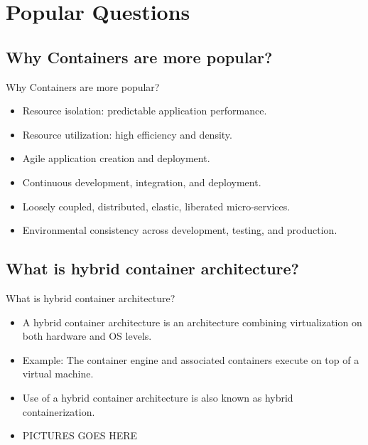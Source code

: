 

\section{Popular Questions}\label{sec:popular-questions}

\subsection{Why Containers are more popular?}\label{subsec:containers-are-more-popular}
\begin{frame}{Why Containers are more popular?}
    \begin{itemize}[<+- | alert@+>]
        \item Resource isolation: predictable application performance.
        \item Resource utilization: high efficiency and density.
        \item Agile application creation and deployment.
        \item Continuous development, integration, and deployment.
        \item Loosely coupled, distributed, elastic, liberated micro-services.
        \item Environmental consistency across development, testing, and production.
    \end{itemize}
\end{frame}

\subsection{What is hybrid container architecture?}\label{subsec:hybrid-container-architecture?}
\begin{frame}{What is hybrid container architecture?}
    \begin{itemize}[<+- | alert@+>]
        \item A hybrid container architecture is an architecture combining virtualization on both hardware and OS levels.
        \item Example: The container engine and associated containers execute on top of a virtual machine.
        \item Use of a hybrid container architecture is also known as hybrid containerization.
        \item PICTURES GOES HERE
    \end{itemize}
\end{frame}


